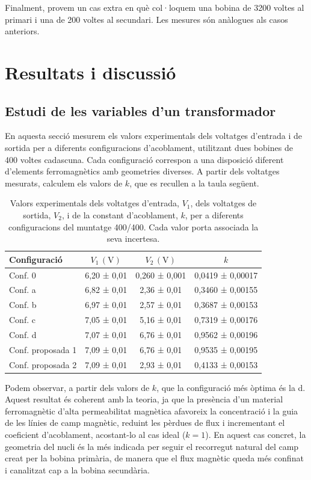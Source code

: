 \documentclass[a4paper,10.5pt]{report}
\begin{document}
Finalment, provem un cas extra en què col·loquem una bobina de 3200 voltes al primari i una de 200 voltes al secundari. Les mesures són anàlogues als casos anteriors.

\section{Resultats i discussió}
\subsection{Estudi de les variables d'un transformador}
En aquesta secció mesurem els valors experimentals dels voltatges d’entrada i de sortida per a diferents configuracions d’acoblament, utilitzant dues bobines de 400 voltes cadascuna. Cada configuració correspon a una disposició diferent d’elements ferromagnètics amb geometries diverses. A partir dels voltatges mesurats, calculem els valors de $k$, que es recullen a la taula següent.

\begin{table}[h]
	\centering
	\renewcommand{\arraystretch}{1.2}
	\caption{Valors experimentals dels voltatges d'entrada, $V_1$, dels voltatges de sortida, $V_2$, i de la constant d'acoblament, $k$, per a diferents configuracions del muntatge 400/400. Cada valor porta associada la seva incertesa.}
	\begin{tabular}{lccc}
		\toprule
		Configuració & $V_1 \,(\mathrm{V})$ & $V_2 \,(\mathrm{V})$ & $k$ \\
		\midrule
		Conf. 0     & 6,20 ± 0,01 & 0,260 ± 0,001 & 0,0419 ± 0,00017 \\
		Conf. a     & 6,82 ± 0,01 & 2,36 ± 0,01   & 0,3460 ± 0,00155 \\
		Conf. b     & 6,97 ± 0,01 & 2,57 ± 0,01   & 0,3687 ± 0,00153 \\
		Conf. c     & 7,05 ± 0,01 & 5,16 ± 0,01   & 0,7319 ± 0,00176 \\
		Conf. d     & 7,07 ± 0,01 & 6,76 ± 0,01   & 0,9562 ± 0,00196 \\
		Conf. proposada 1  & 7,09 ± 0,01 & 6,76 ± 0,01   & 0,9535 ± 0,00195 \\
		Conf. proposada 2  & 7,09 ± 0,01 & 2,93 ± 0,01   & 0,4133 ± 0,00153 \\
		\bottomrule
	\end{tabular}
\end{table}


Podem observar, a partir dels valors de $k$, que la configuració més òptima és la d. Aquest resultat és coherent amb la teoria, ja que la presència d’un material ferromagnètic d’alta permeabilitat magnètica afavoreix la concentració i la guia de les línies de camp magnètic, reduint les pèrdues de flux i incrementant el coeficient d’acoblament, acostant-lo al cas ideal ($k = 1$). En aquest cas concret, la geometria del nucli és la més indicada per seguir el recorregut natural del camp creat per la bobina primària, de manera que el flux magnètic queda més confinat i canalitzat cap a la bobina secundària.
\end{document}
